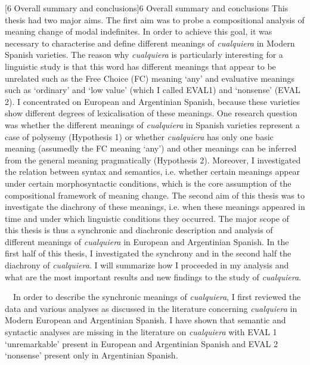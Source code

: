 \documentclass[10pt]{article}
\makeatletter
\renewcommand\section{\@startsection{section}{1}{0.0cm}{0.5in}{0.3335in}{\normalfont\normalsize\fontsize{12pt}{14.4pt}\selectfont\bfseries\raggedright}}
\newenvironment{styleStandard}{\renewcommand\baselinestretch{1.25}\setlength\leftskip{0cm}\setlength\rightskip{0cm}\setlength\parindent{0cm}\setlength\parfillskip{0pt plus 1fil}\setlength\parskip{0in plus 1pt}\writerlistparindent\writerlistleftskip\leavevmode\normalfont\normalsize\fontsize{12pt}{14.4pt}\selectfont\writerlistlabel\ignorespaces}{\unskip\vspace{0in plus 1pt}\par}
\newcommand\writerlistleftskip{}
\newcommand\writerlistparindent{}
\newcommand\writerlistlabel{}
\makeatother
\begin{document}
\clearpage\section[6 Overall summary and conclusions]{6 Overall summary and conclusions}
\begin{styleStandard}
This thesis had two major aims. The first aim was to probe a compositional analysis of meaning change of modal indefinites. In order to achieve this goal, it was necessary to characterise and define different meanings of \textit{cualquiera} in Modern Spanish varieties. The reason why \textit{cualquiera} is particularly interesting for a linguistic study is that this word has different meanings that appear to be unrelated such as the Free Choice (FC) meaning ‘any’ and evaluative meanings such as ‘ordinary’ and ‘low value’ (which I called EVAL1) and ‘nonsense’ (EVAL 2). I concentrated on European and Argentinian Spanish, because these varieties show different degrees of lexicalisation of these meanings. One research question was whether the different meanings of \textit{cualquiera} in Spanish varieties represent a case of polysemy (Hypothesis 1) or whether \textit{cualquiera} has only one basic meaning (assumedly the FC meaning ‘any’) and other meanings can be inferred from the general meaning pragmatically (Hypothesis 2). Moreover, I investigated the relation between syntax and semantics, i.e. whether certain meanings appear under certain morphosyntactic conditions, which is the core assumption of the compositional framework of meaning change. The second aim of this thesis was to investigate the diachrony of these meanings, i.e. when these meanings appeared in time and under which linguistic conditions they occurred. The major scope of this thesis is thus a synchronic and diachronic description and analysis of different meanings of \textit{cualquiera} in European and Argentinian Spanish. In the first half of this thesis, I investigated the synchrony and in the second half the diachrony of \textit{cualquiera}. I will summarize how I proceeded in my analysis and what are the most important results and new findings to the study of \textit{cualquiera}.
\end{styleStandard}

\begin{styleStandard}
\ \ In order to describe the synchronic meanings of \textit{cualquiera}, I first reviewed the data and various analyses as discussed in the literature concerning \textit{cualquiera} in Modern European and Argentinian Spanish. I have shown that semantic and syntactic analyses are missing in the literature on \textit{cualquiera} with EVAL 1 ‘unremarkable’ present in European and Argentinian Spanish and EVAL 2 ‘nonsense’ present only in Argentinian Spanish.
\end{styleStandard}
\end{document}
